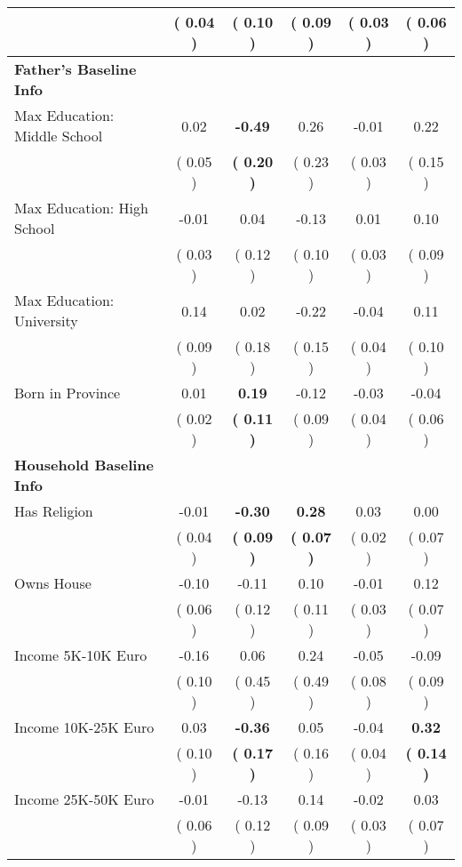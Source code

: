 \begin{table}[H]
{\begin{tabular}{lccccc}
\quad  & (     0.04 ) & (     0.10 )  & (     0.09 )  & (     0.03 ) & (     0.06 ) \\
\midrule
\textbf{Father's Baseline Info} \\
\quad Max Education: Middle School &      0.02 & \textbf{    -0.49} &      0.26 &     -0.01 &      0.22 \\
\quad  & (     0.05 ) & \textbf{(     0.20 )}  & (     0.23 )  & (     0.03 ) & (     0.15 ) \\
\quad Max Education: High School &     -0.01 &      0.04 &     -0.13 &      0.01 &      0.10 \\
\quad  & (     0.03 ) & (     0.12 )  & (     0.10 )  & (     0.03 ) & (     0.09 ) \\
\quad Max Education: University &      0.14 &      0.02 &     -0.22 &     -0.04 &      0.11 \\
\quad  & (     0.09 ) & (     0.18 )  & (     0.15 )  & (     0.04 ) & (     0.10 ) \\
\quad Born in Province &      0.01 & \textbf{     0.19} &     -0.12 &     -0.03 &     -0.04 \\
\quad  & (     0.02 ) & \textbf{(     0.11 )}  & (     0.09 )  & (     0.04 ) & (     0.06 ) \\
\midrule
\textbf{Household Baseline Info} \\
\quad Has Religion &     -0.01 & \textbf{    -0.30} & \textbf{     0.28} &      0.03 &      0.00 \\
\quad  & (     0.04 ) & \textbf{(     0.09 )}  & \textbf{(     0.07 )}  & (     0.02 ) & (     0.07 ) \\
\quad Owns House &     -0.10 &     -0.11 &      0.10 &     -0.01 &      0.12 \\
\quad  & (     0.06 ) & (     0.12 )  & (     0.11 )  & (     0.03 ) & (     0.07 ) \\
\quad Income 5K-10K Euro &     -0.16 &      0.06 &      0.24 &     -0.05 &     -0.09 \\
\quad  & (     0.10 ) & (     0.45 )  & (     0.49 )  & (     0.08 ) & (     0.09 ) \\
\quad Income 10K-25K Euro &      0.03 & \textbf{    -0.36} &      0.05 &     -0.04 & \textbf{     0.32} \\
\quad  & (     0.10 ) & \textbf{(     0.17 )}  & (     0.16 )  & (     0.04 ) & \textbf{(     0.14 )} \\
\quad Income 25K-50K Euro &     -0.01 &     -0.13 &      0.14 &     -0.02 &      0.03 \\
\quad  & (     0.06 ) & (     0.12 )  & (     0.09 )  & (     0.03 ) & (     0.07 ) \\

\end{tabular}}
\end{table}
